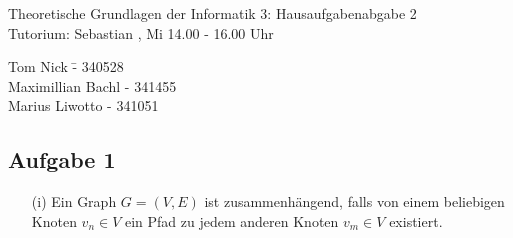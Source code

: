 \documentclass[a4paper,10pt]{article}
\begin{document}
\begin{center}
\Large{Theoretische Grundlagen der Informatik 3: Hausaufgabenabgabe 2} \\
\large{Tutorium: Sebastian , Mi 14.00 - 16.00 Uhr}
\end{center}
\begin{tabbing}
Tom Nick \hspace{2cm}\= - 340528\\
Maximillian Bachl \> - 341455 \\
Marius Liwotto\> -  341051
\end{tabbing}
	\subsection*{Aufgabe 1}

	\begin{enumerate}
	\item[(i)]
%	
%	
%	
%	
%		
%		
Ein Graph $G = (V,E)$ ist zusammenhängend, falls von einem beliebigen Knoten $v_n \in V$ ein Pfad zu jedem anderen Knoten $v_m \in V$ existiert. 


\end{enumerate}
\end{document}
